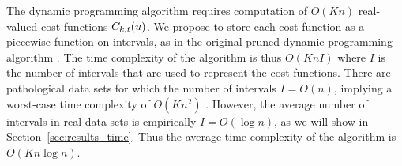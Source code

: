 \documentclass{article}
\begin{document}


The dynamic programming algorithm requires computation of $O(Kn)$
real-valued cost functions $C_{k,t}(u)$. We propose to store each
cost function as a piecewise function on intervals, as in the original
pruned dynamic programming algorithm \citep{pruned-dp}. The time
complexity of the algorithm is thus $O(K n I)$ where $I$ is the number
of intervals that are used to represent the cost functions. There are
pathological data sets for which the number of intervals $I=O(n)$,
implying a worst-case time complexity of $O(K n^2)$
\citep{pruned-dp-new}. However, the average number of intervals in
real data sets is empirically $I=O(\log n)$, as we will show in
Section~\ref{sec:results_time}. Thus the average time complexity of
the algorithm is $O(K n \log n)$.
\end{document}
